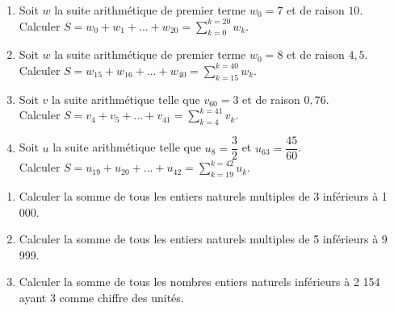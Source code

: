 \documentclass[11pt]{article}
\begin{document}
\begin{exercice}
\begin{multicols}{2}
\begin{enumerate}
\item Soit $w$ la suite arithmétique de premier terme $w_0 = 7$ et de
raison $10$.\\
Calculer
$\displaystyle S = w_0 + w_1 + ... + w_{20} =\sum_{k=0}^{k=20}w_k$.
\item Soit $w$ la suite arithmétique de premier terme $w_0 = 8$ et de
raison $4,5$.\\
Calculer
$\displaystyle S = w_{15} + w_{16} + ... + w_{40}
=\sum_{k=15}^{k=40}w_k$.
\columnbreak
\item Soit $v$ la suite arithmétique telle que $v_{60} = 3$ et de
raison $0,76$.\\
Calculer
$\displaystyle S = v_{4} + v_{5} + ... + v_{41} =\sum_{k=4}^{k=41}v_k$.
\item Soit $u$ la suite arithmétique telle que $u_8 = \dfrac{3}{2}$
et $u_{63} = \dfrac{45}{60}$.\\
Calculer
$\displaystyle S = u_{19} + u_{20} + ... + u_{42}
=\sum_{k=19}^{k=42}u_k$.
\end{enumerate}
\end{multicols}
\end{exercice}

\begin{exercice}
\begin{enumerate}
\item Calculer la somme de tous les entiers naturels multiples de 3 inférieurs à 1 000.
\item Calculer la somme de tous les entiers naturels multiples de 5
inférieurs à 9 999.
\item Calculer la somme de tous les nombres entiers naturels
inférieurs à 2 154 ayant 3 comme chiffre des unités.
\end{enumerate}
\end{exercice}
\end{document}
